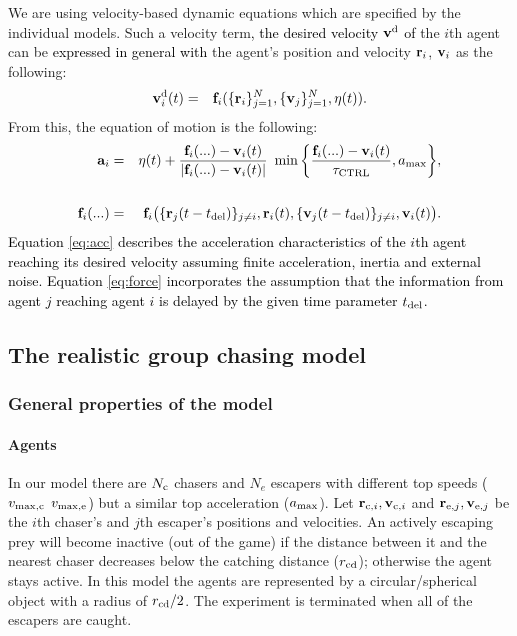 \documentclass[12pt,a4paper,final]{iopart}
\newcommand{\revision}{\textcolor{black}}
\newcommand{\revisiontwo}{\textcolor{black}}
\begin{document}
We are using velocity-based dynamic equations which are specified by the individual models. Such a velocity term\revision{, the desired velocity ${\bf v}^{\rm d}$ of}  the $i$th agent can be \revision{expressed in general with} the agent's position and velocity ${\bf r}_i$, ${\bf v}_i$ as the following:
\begin{eqnarray}
{\bf v}_i^{\rm d} (t) &=& {\bf f}_i(\{{\bf r}_i \}_{j=1}^N,\{ {\bf v}_j \}_{j=1}^N, {\bf \eta}(t)).
\end{eqnarray}
From this, the equation of motion is the following:
\begin{eqnarray}
{\bf a}_i &=& {\bf \eta}(t) + \frac{{\bf f}_i(...) - {\bf v}_i (t) }{|{\bf f}_i(...) - {\bf v}_i (t) |} \  \min \bigg\{ \frac{{\bf f}_i
(...) - {\bf v}_i (t) }{\tau_{\rm CTRL}}, a_{\rm max} \bigg\},  \label{eq:acc}\\ \nonumber \\
{\bf f}_i(...) &=& {\bf f}_i \big(\{ {\bf r}_j(t-t_{\rm del}) \}_{j 
\ne i}, {\bf r}_i(t), \{ {\bf v}_j(t-t_{\rm del}) \}_{j \ne i}, {\bf v}_i(t) \big). \label{eq:force}
\end{eqnarray}
\revision{Equation \ref{eq:acc} describes the acceleration characteristics of the $i$th agent reaching its desired velocity assuming finite acceleration, inertia and external noise. Equation \ref{eq:force} incorporates the assumption that the information from agent $j$ reaching agent $i$ is delayed \revision{by the given time parameter \revisiontwo{$t_{\rm del}$}}. }


\subsection{The realistic group chasing model}

\subsubsection{General properties of the model}

\paragraph{Agents}

In our model there are $N_{\rm c}$ chasers and $N_{e}$ escapers with different top speeds \revision{($v_{\rm max, c}$ $v_{\rm max, e}$)} but a similar top acceleration ($a_{\rm max}$). Let ${\bf r}_{{\rm c},i}, {\bf v}_{{\rm c},i}$ and ${\bf r}_{{\rm e},j}, {\bf v}_{{\rm e},j}$ be the $i$th chaser's and $j$th escaper's positions and velocities. An actively escaping prey will become inactive (out of the game) if the distance between it and the nearest chaser decreases below the catching distance ($r_{\rm cd}$); otherwise the agent stays active. In this model the agents are represented by a circular/spherical object with a radius of \revision{$r_{\rm cd}/2$}. The experiment is terminated when all of the escapers are caught.
\end{document}
